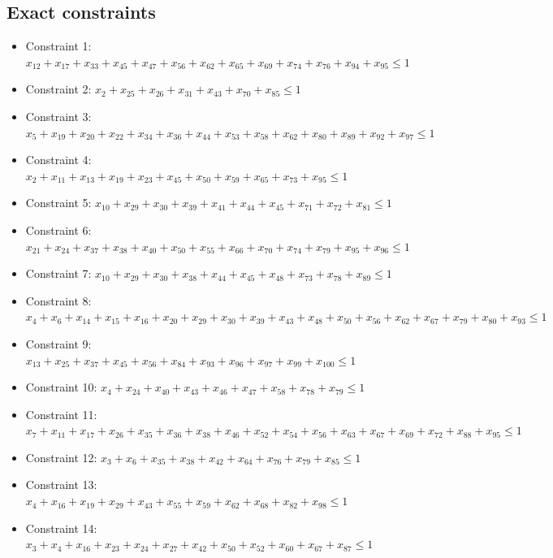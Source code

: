 \documentclass[11pt]{article}
\begin{document}
\subsection*{Exact constraints}
\begin{itemize}
\item Constraint 1: $x_{12} + x_{17} + x_{33} + x_{45} + x_{47} + x_{56} + x_{62} + x_{65} + x_{69} + x_{74} + x_{76} + x_{94} + x_{95} \le 1$
\item Constraint 2: $x_{2} + x_{25} + x_{26} + x_{31} + x_{43} + x_{70} + x_{85} \le 1$
\item Constraint 3: $x_{5} + x_{19} + x_{20} + x_{22} + x_{34} + x_{36} + x_{44} + x_{53} + x_{58} + x_{62} + x_{80} + x_{89} + x_{92} + x_{97} \le 1$
\item Constraint 4: $x_{2} + x_{11} + x_{13} + x_{19} + x_{23} + x_{45} + x_{50} + x_{59} + x_{65} + x_{73} + x_{95} \le 1$
\item Constraint 5: $x_{10} + x_{29} + x_{30} + x_{39} + x_{41} + x_{44} + x_{45} + x_{71} + x_{72} + x_{81} \le 1$
\item Constraint 6: $x_{21} + x_{24} + x_{37} + x_{38} + x_{40} + x_{50} + x_{55} + x_{66} + x_{70} + x_{74} + x_{79} + x_{95} + x_{96} \le 1$
\item Constraint 7: $x_{10} + x_{29} + x_{30} + x_{38} + x_{44} + x_{45} + x_{48} + x_{73} + x_{78} + x_{89} \le 1$
\item Constraint 8: $x_{4} + x_{6} + x_{14} + x_{15} + x_{16} + x_{20} + x_{29} + x_{30} + x_{39} + x_{43} + x_{48} + x_{50} + x_{56} + x_{62} + x_{67} + x_{79} + x_{80} + x_{93} \le 1$
\item Constraint 9: $x_{13} + x_{25} + x_{37} + x_{45} + x_{56} + x_{84} + x_{93} + x_{96} + x_{97} + x_{99} + x_{100} \le 1$
\item Constraint 10: $x_{4} + x_{24} + x_{40} + x_{43} + x_{46} + x_{47} + x_{58} + x_{78} + x_{79} \le 1$
\item Constraint 11: $x_{7} + x_{11} + x_{17} + x_{26} + x_{35} + x_{36} + x_{38} + x_{46} + x_{52} + x_{54} + x_{56} + x_{63} + x_{67} + x_{69} + x_{72} + x_{88} + x_{95} \le 1$
\item Constraint 12: $x_{3} + x_{6} + x_{35} + x_{38} + x_{42} + x_{64} + x_{76} + x_{79} + x_{85} \le 1$
\item Constraint 13: $x_{4} + x_{16} + x_{19} + x_{29} + x_{43} + x_{55} + x_{59} + x_{62} + x_{68} + x_{82} + x_{98} \le 1$
\item Constraint 14: $x_{3} + x_{4} + x_{16} + x_{23} + x_{24} + x_{27} + x_{42} + x_{50} + x_{52} + x_{60} + x_{67} + x_{87} \le 1$

\end{itemize}
\end{document}
